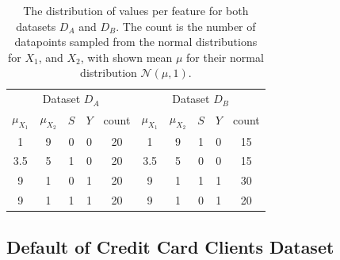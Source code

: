 \documentclass[runningheads]{llncs}
\begin{document}
\begin{table}
    \centering
    \caption{The distribution of values per feature for both datasets $D_A$ and $D_B$. The count is the number of datapoints sampled from the normal distributions for $X_1$, and $X_2$, with shown mean $\mu$ for their normal distribution $\mathcal{N}(\mu, 1)$.}
    \label{tab:syndata}
    \begin{tabularx}{.7\textwidth}{@{\extracolsep{\fill}}cccccccccc}
        \toprule
        \multicolumn{5}{c}{Dataset $D_A$} & \multicolumn{5}{c}{Dataset $D_B$}\\
        \cmidrule(lr){1-5}\cmidrule(lr){6-10}
        $\mu_{X_1}$ & $\mu_{X_2}$ & $S$ & $Y$ & count & $\mu_{X_1}$ & $\mu_{X_2}$ & $S$ & $Y$ & count\\
        \midrule
        1 & 9 & 0 & 0 & 20 & \hspace{0.2cm} 1 & 9 & 1 & 0 & 15\\
        3.5 & 5 & 1 & 0 & 20 &\hspace{0.2cm} 3.5 & 5 & 0 & 0 & 15\\
        9 & 1 & 0 & 1 & 20 &\hspace{0.2cm}  9 & 1 & 1 & 1 & 30\\
        9 & 1 & 1 & 1 & 20 & \hspace{0.2cm} 9 & 1 & 0 & 1 & 20\\
        \bottomrule
    \end{tabularx}
\end{table}

\subsection{Default of Credit Card Clients Dataset}\label{sec:taiwan}
\end{document}
